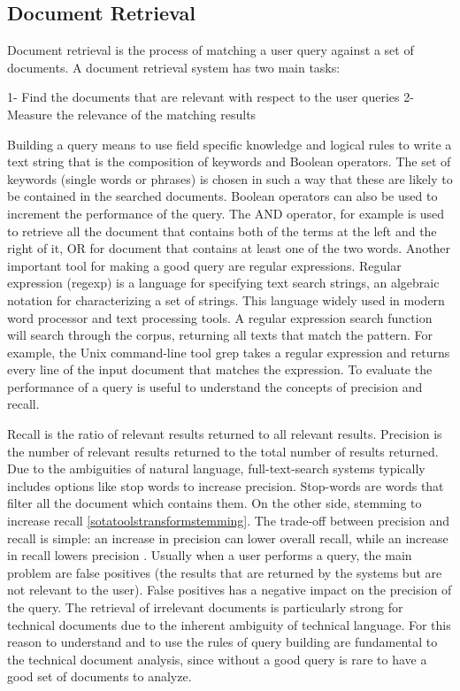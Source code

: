 \documentclass[]{book}
\begin{document}
\subsection{Document Retrieval}\label{sotatoolsimportretrieval}

Document retrieval is the process of matching a user query against a set
of documents. A document retrieval system has two main tasks:

1- Find the documents that are relevant with respect to the user queries
2- Measure the relevance of the matching results

Building a query means to use field specific knowledge and logical rules
to write a text string that is the composition of keywords and Boolean
operators. The set of keywords (single words or phrases) is chosen in
such a way that these are likely to be contained in the searched
documents. Boolean operators can also be used to increment the
performance of the query. The AND operator, for example is used to
retrieve all the document that contains both of the terms at the left
and the right of it, OR for document that contains at least one of the
two words. Another important tool for making a good query are regular
expressions. Regular expression (regexp) is a language for specifying
text search strings, an algebraic notation for characterizing a set of
strings. This language widely used in modern word processor and text
processing tools. A regular expression search function will search
through the corpus, returning all texts that match the pattern. For
example, the Unix command-line tool grep takes a regular expression and
returns every line of the input document that matches the expression. To
evaluate the performance of a query is useful to understand the concepts
of precision and recall.

Recall is the ratio of relevant results returned to all relevant
results. Precision is the number of relevant results returned to the
total number of results returned. Due to the ambiguities of natural
language, full-text-search systems typically includes options like stop
words to increase precision. Stop-words are words that filter all the
document which contains them. On the other side, stemming to increase
recall \ref{sotatoolstransformstemming}. The trade-off between precision
and recall is simple: an increase in precision can lower overall recall,
while an increase in recall lowers precision \citep{yuwono1996search}.
Usually when a user performs a query, the main problem are false
positives (the results that are returned by the systems but are not
relevant to the user). False positives has a negative impact on the
precision of the query. The retrieval of irrelevant documents is
particularly strong for technical documents due to the inherent
ambiguity of technical language. For this reason to understand and to
use the rules of query building are fundamental to the technical
document analysis, since without a good query is rare to have a good set
of documents to analyze.
\end{document}
